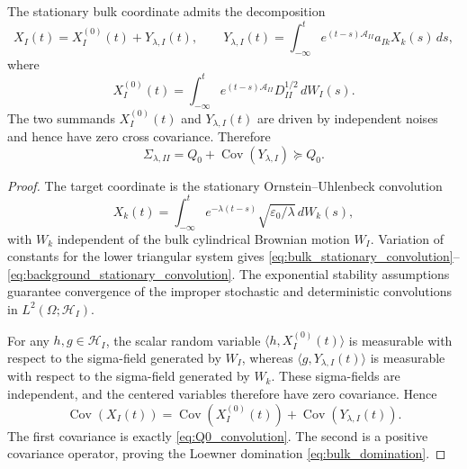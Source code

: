 \begin{lemma}
\label{lem:bulk_domination_convolution}
The stationary bulk coordinate admits the decomposition
\begin{equation}
  X_I(t)=X_I^{(0)}(t)+Y_{\lambda,I}(t),
  \qquad
  Y_{\lambda,I}(t)
  =
  \int_{-\infty}^t
  e^{(t-s)\mathcal{A}_{II}}a_{Ik}X_k(s)\,ds,
  \label{eq:bulk_stationary_convolution}
\end{equation}
where
\begin{equation}
  X_I^{(0)}(t)
  =
  \int_{-\infty}^t
  e^{(t-s)\mathcal{A}_{II}}D_{II}^{1/2}\,dW_I(s).
  \label{eq:background_stationary_convolution}
\end{equation}
The two summands $X_I^{(0)}(t)$ and $Y_{\lambda,I}(t)$ are driven by independent
noises and hence have zero cross covariance.  Therefore
\begin{equation}
  \Sigma_{\lambda,II}
  =Q_0+\operatorname{Cov}(Y_{\lambda,I})\succeq Q_0.
  \label{eq:bulk_domination}
\end{equation}
\end{lemma}

\begin{proof}
The target coordinate is the stationary Ornstein--Uhlenbeck convolution
\begin{equation}
  X_k(t)
  =
  \int_{-\infty}^t e^{-\lambda(t-s)}
  \sqrt{\varepsilon_0/\lambda}\,dW_k(s),
  \label{eq:target_stationary_convolution}
\end{equation}
with $W_k$ independent of the bulk cylindrical Brownian motion $W_I$.  Variation
of constants for the lower triangular system gives
\eqref{eq:bulk_stationary_convolution}--\eqref{eq:background_stationary_convolution}.
The exponential stability assumptions guarantee convergence of the improper
stochastic and deterministic convolutions in $L^2(\Omega;\mathcal{H}_I)$.

For any $h,g\in\mathcal{H}_I$, the scalar random variable
$\langle h,X_I^{(0)}(t)\rangle$ is measurable with respect to the sigma-field
generated by $W_I$, whereas $\langle g,Y_{\lambda,I}(t)\rangle$ is measurable
with respect to the sigma-field generated by $W_k$.  These sigma-fields are
independent, and the centered variables therefore have zero covariance.  Hence
\[
  \operatorname{Cov}(X_I(t))
  =\operatorname{Cov}(X_I^{(0)}(t))
   +\operatorname{Cov}(Y_{\lambda,I}(t)).
\]
The first covariance is exactly \eqref{eq:Q0_convolution}.  The second is a
positive covariance operator, proving the Loewner domination
\eqref{eq:bulk_domination}.
\end{proof}

